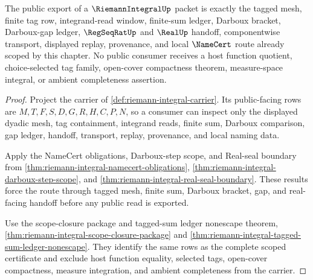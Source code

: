 \begin{theorem}
\label{thm:riemann-integral-public-tagged-mesh-certificate}
The public export of a $\RiemannIntegralUp$ packet is exactly the tagged mesh, finite tag row, integrand-read window, finite-sum ledger, Darboux bracket, Darboux-gap ledger, $\RegSeqRatUp$ and $\RealUp$ handoff, componentwise transport, displayed replay, provenance, and local $\NameCert$ route already scoped by this chapter. No public consumer receives a host function quotient, choice-selected tag family, open-cover compactness theorem, measure-space integral, or ambient completeness assertion.
\end{theorem}
\begin{proof}
Project the carrier of \autoref{def:riemann-integral-carrier}. Its public-facing rows are $M,T,F,S,D,G,R,H,C,P,N$, so a consumer can inspect only the displayed dyadic mesh, tag containment, integrand reads, finite sum, Darboux comparison, gap ledger, handoff, transport, replay, provenance, and local naming data.

Apply the NameCert obligations, Darboux-step scope, and Real-seal boundary from \autoref{thm:riemann-integral-namecert-obligations}, \autoref{thm:riemann-integral-darboux-step-scope}, and \autoref{thm:riemann-integral-real-seal-boundary}. These results force the route through tagged mesh, finite sum, Darboux bracket, gap, and real-facing handoff before any public read is exported.

Use the scope-closure package and tagged-sum ledger nonescape theorem, \autoref{thm:riemann-integral-scope-closure-package} and \autoref{thm:riemann-integral-tagged-sum-ledger-nonescape}. They identify the same rows as the complete scoped certificate and exclude host function equality, selected tags, open-cover compactness, measure integration, and ambient completeness from the carrier.
\end{proof}

